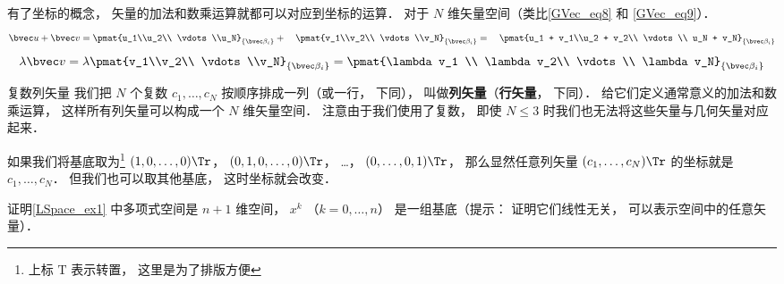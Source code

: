 有了坐标的概念， 矢量的加法和数乘运算就都可以对应到坐标的运算． 对于 $N$ 维矢量空间（类比\autoref{GVec_eq8} 和 \autoref{GVec_eq9}）．
\begin{equation}
\bvec u + \bvec v = \pmat{u_1\\u_2\\ \vdots\\u_N}_{\{\bvec\beta_i\}} + \quad \pmat{v_1\\v_2\\ \vdots \\v_N}_{\{\bvec\beta_i\}} = \quad \pmat{u_1 + v_1\\u_2 + v_2\\ \vdots \\ u_N + v_N}_{\{\bvec\beta_i\}}
\end{equation}
\begin{equation}
\lambda \bvec v = \lambda\pmat{v_1\\v_2\\ \vdots \\v_N}_{\{\bvec\beta_i\}} = \pmat{\lambda v_1 \\ \lambda v_2\\ \vdots \\ \lambda v_N}_{\{\bvec\beta_i\}}
\end{equation}

\begin{exercise}{复数列矢量}
我们把 $N$ 个复数 $c_1, \dots, c_N$ 按顺序排成一列（或一行， 下同）， 叫做\textbf{列矢量}（\textbf{行矢量}， 下同）． 给它们定义通常意义的加法和数乘运算， 这样所有列矢量可以构成一个 $N$ 维矢量空间． 注意由于我们使用了复数， 即使 $N \leqslant 3$ 时我们也无法将这些矢量与几何矢量对应起来．

如果我们将基底取为\footnote{上标 $\mathrm T$ 表示转置， 这里是为了排版方便} $(1, 0, \dots, 0)\Tr$， $(0, 1, 0, \dots, 0)\Tr$， …， $(0, \dots, 0, 1)\Tr$， 那么显然任意列矢量 $(c_1, \dots, c_N)\Tr$ 的坐标就是 $c_1, \dots, c_N$． 但我们也可以取其他基底， 这时坐标就会改变．
\end{exercise}

\begin{exercise}{}
证明\autoref{LSpace_ex1} 中多项式空间是 $n+1$ 维空间， $x^k$ （$k = 0, \dots, n$） 是一组基底（提示： 证明它们线性无关， 可以表示空间中的任意矢量）．
\end{exercise}
